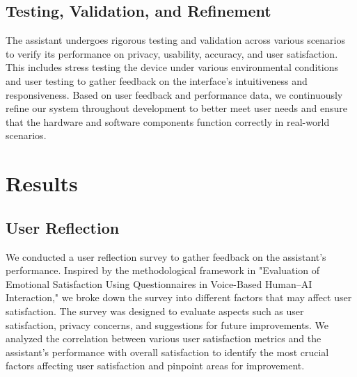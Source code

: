 \documentclass[12pt]{article}
\begin{document}
\subsection{Testing, Validation, and Refinement}
The assistant undergoes rigorous testing and validation across various scenarios to verify its performance on privacy, usability, accuracy, and user satisfaction. This includes stress testing the device under various environmental conditions and user testing to gather feedback on the interface's intuitiveness and responsiveness. Based on user feedback and performance data, we continuously refine our system throughout development to better meet user needs and ensure that the hardware and software components function correctly in real-world scenarios. 

\section{Results}
\subsection{User Reflection}
We conducted a user reflection survey to gather feedback on the assistant's performance. Inspired by the methodological framework in "Evaluation of Emotional Satisfaction Using Questionnaires in Voice-Based Human–AI Interaction," we broke down the survey into different factors that may affect user satisfaction. The survey was designed to evaluate aspects such as user satisfaction, privacy concerns, and suggestions for future improvements. We analyzed the correlation between various user satisfaction metrics and the assistant's performance with overall satisfaction to identify the most crucial factors affecting user satisfaction and pinpoint areas for improvement.
\end{document}
